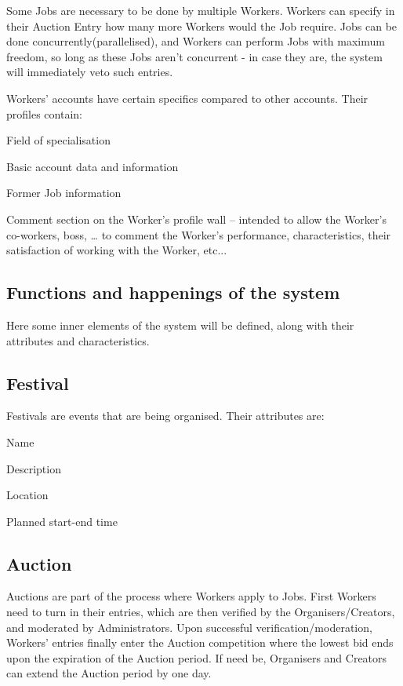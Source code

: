 		 Some Jobs are necessary to be done by multiple Workers. Workers can specify in their Auction Entry how many more Workers would the Job require. Jobs can be done concurrently(parallelised), and Workers can perform Jobs with maximum freedom, so long as these Jobs aren't concurrent - in case they are, the system will immediately veto such entries.
		
		 Workers' accounts have certain specifics compared to other accounts. Their profiles contain:
		\begin{packed_enum}
			\item Field of specialisation
			\item Basic account data and information
			\item Former Job information
			\item Comment section on the Worker’s profile wall – intended to allow the Worker’s co-workers, boss, … to comment the Worker’s performance, characteristics, their satisfaction of working with the Worker, etc...
		\end{packed_enum}
		
	\subsection{Functions and happenings of the system}
	 Here some inner elements of the system will be defined, along with their attributes and characteristics.
		\subsection{Festival}
		 Festivals are events that are being organised. Their attributes are:
		
		\begin{packed_enum}
			\item Name
			\item Description
			\item Location
			\item Planned start-end time
		\end{packed_enum}
		
		\subsection{Auction}
		 Auctions are part of the process where Workers apply to Jobs. First Workers need to turn in their entries, which are then verified by the Organisers/Creators, and moderated by Administrators. Upon successful verification/moderation, Workers' entries finally enter the Auction
		competition where the lowest bid ends upon the expiration of the Auction period. If need be, Organisers and Creators can extend the Auction period by one day.
	
